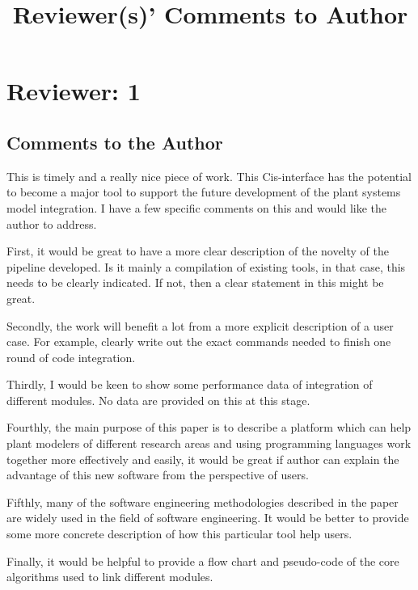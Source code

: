 \documentclass[11pt]{article}
\title{Reviewer(s)' Comments to Author}
\newcommand{\cmark}{\ding{51}}%
\newcommand{\done}{\rlap{$\square$}{\raisebox{2pt}{\large\hspace{1pt}\cmark}}%
\hspace{-2.5pt}}
\begin{document}
\maketitle



\section{Reviewer: 1}

\subsection{Comments to the Author}

This is timely and a really nice piece of work. This Cis-interface has the potential to become a major tool to support the future development of the plant systems model integration. I have a few specific comments on this and would like the author to address. 
\begin{todolist}
\item First, it would be great to have a more clear description of the novelty of the pipeline developed. Is it mainly a compilation of existing tools, in that case, this needs to be clearly indicated. If not, then a clear statement in this might be great. 
\item[\done] Secondly, the work will benefit a lot from a more explicit description of a user case. For example, clearly write out the exact commands needed to finish one round of code integration. 
\item Thirdly, I would be keen to show some performance data of integration of different modules. No data are provided on this at this stage. 
\item Fourthly, the main purpose of this paper is to describe a platform which can help plant modelers of different research areas and using programming languages work together more effectively and easily, it would be great if author can explain the advantage of this new software from the perspective of users. 
\item Fifthly,  many of the software engineering methodologies described in the paper are widely used in the field of software engineering. It would be better to provide some more concrete description of how this particular tool help users.  
\item Finally, it would be helpful to provide a flow chart and pseudo-code of the core algorithms used to link different modules.
\end{todolist}
\end{document}
